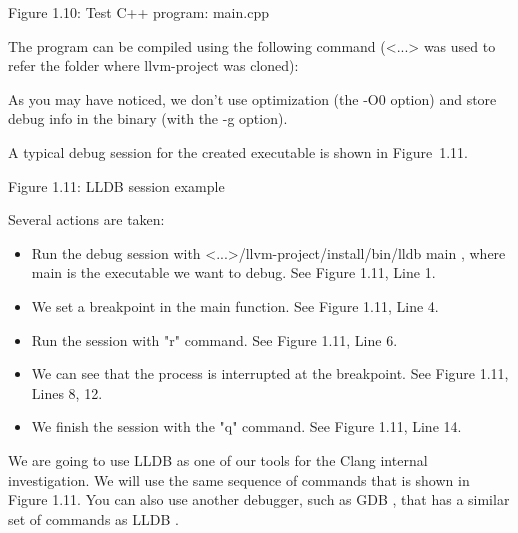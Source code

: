 \begin{center}
Figure 1.10: Test C++ program: main.cpp
\end{center}

The program can be compiled using the following command (<...> was used to refer the folder where llvm-project was cloned):


As you may have noticed, we don't use optimization (the -O0 option) and store debug info in the binary (with the -g option).

A typical debug session for the created executable is shown in Figure 1.11.


\begin{center}
Figure 1.11: LLDB session example
\end{center}

Several actions are taken:

\begin{itemize}
\item
Run the debug session with <...>/llvm-project/install/bin/lldb main , where main is the executable we want to debug. See Figure 1.11, Line 1.

\item
We set a breakpoint in the main function. See Figure 1.11, Line 4.

\item
Run the session with "r" command. See Figure 1.11, Line 6.

\item
We can see that the process is interrupted at the breakpoint. See Figure 1.11, Lines 8, 12.

\item
We finish the session with the "q" command. See Figure 1.11, Line 14.
\end{itemize}

We are going to use LLDB as one of our tools for the Clang internal investigation. We will use the same sequence of commands that is shown in Figure 1.11. You can also use another debugger, such as GDB , that has a similar set of commands as LLDB .






